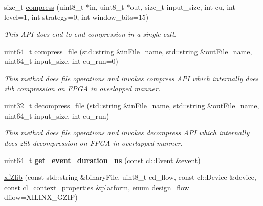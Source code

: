 \begin{DoxyCompactItemize}
size\-\_\-t \hyperlink{classxf_1_1compression_1_1xfZlib_aed3a52d3bcb4e2603d367a559c85e175}{compress} (uint8\-\_\-t $\ast$in, uint8\-\_\-t $\ast$out, size\-\_\-t input\-\_\-size, int cu, int level=1, int strategy=0, int window\-\_\-bits=15)
\begin{DoxyCompactList}\small\item\em This A\-P\-I does end to end compression in a single call. \end{DoxyCompactList}\item 
uint64\-\_\-t \hyperlink{classxf_1_1compression_1_1xfZlib_a4dae7f3471aa3788ffc0c11a9b6196fc}{compress\-\_\-file} (std\-::string \&in\-File\-\_\-name, std\-::string \&out\-File\-\_\-name, uint64\-\_\-t input\-\_\-size, int cu\-\_\-run=0)
\begin{DoxyCompactList}\small\item\em This method does file operations and invokes compress A\-P\-I which internally does zlib compression on F\-P\-G\-A in overlapped manner. \end{DoxyCompactList}\item 
uint32\-\_\-t \hyperlink{classxf_1_1compression_1_1xfZlib_a847206ba337f6811dbd477c1533586c3}{decompress\-\_\-file} (std\-::string \&in\-File\-\_\-name, std\-::string \&out\-File\-\_\-name, uint64\-\_\-t input\-\_\-size, int cu\-\_\-run)
\begin{DoxyCompactList}\small\item\em This method does file operations and invokes decompress A\-P\-I which internally does zlib decompression on F\-P\-G\-A in overlapped manner. \end{DoxyCompactList}\item 
\hypertarget{classxf_1_1compression_1_1xfZlib_aa2477f22a23fc8ce1ffa8c968c588f29}{uint64\-\_\-t {\bfseries get\-\_\-event\-\_\-duration\-\_\-ns} (const cl\-::\-Event \&event)}\label{classxf_1_1compression_1_1xfZlib_aa2477f22a23fc8ce1ffa8c968c588f29}

\item 
\hypertarget{classxf_1_1compression_1_1xfZlib_a6bfce462da5c36380222b69972dfbfd4}{\hyperlink{classxf_1_1compression_1_1xfZlib_a6bfce462da5c36380222b69972dfbfd4}{xf\-Zlib} (const std\-::string \&binary\-File, uint8\-\_\-t cd\-\_\-flow, const cl\-::\-Device \&device, const cl\-\_\-context\-\_\-properties \&platform, enum design\-\_\-flow dflow=X\-I\-L\-I\-N\-X\-\_\-\-G\-Z\-I\-P)}\label{classxf_1_1compression_1_1xfZlib_a6bfce462da5c36380222b69972dfbfd4}


\end{DoxyCompactItemize}

